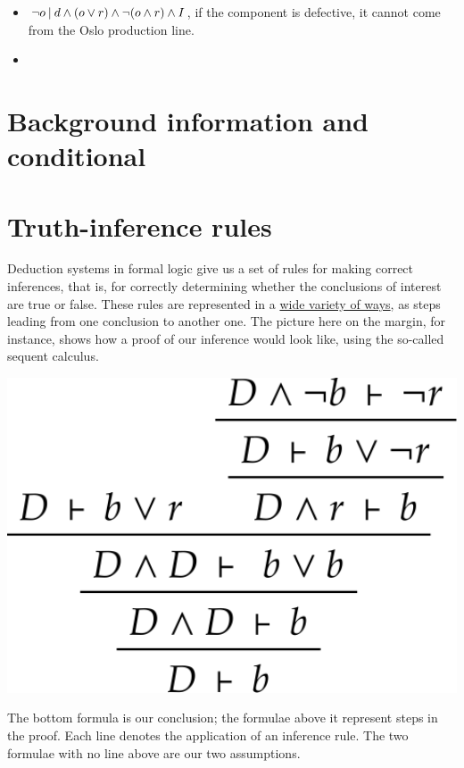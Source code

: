 \documentclass[
  a4paper,
  DIV=11,
  numbers=noendperiod,
  oneside]{scrreprt}
\begin{document}
\begin{itemize}
\item
  \(\lnot o \nonscript\:\vert\nonscript\:\mathopen{} d \land (o \lor r) \land \lnot (o \land r) \land I\),
  if the component is defective, it cannot come from the Oslo production
  line.
\item
\end{itemize}

\hypertarget{background-information-and-conditional}{%
\section{Background information and
conditional}\label{background-information-and-conditional}}

\hfill\break

\hypertarget{truth-inference-rules}{%
\section{Truth-inference rules}\label{truth-inference-rules}}

Deduction systems in formal logic give us a set of rules for making
correct inferences, that is, for correctly determining whether the
conclusions of interest are true or false. These rules are represented
in a
\href{https://plato.stanford.edu/archives/spr2023/entries/natural-deduction}{wide
variety of ways}, as steps leading from one conclusion to another one.
The picture here on the margin, for instance, shows how a proof of our
inference would look like, using the so-called sequent calculus.

\begin{marginfigure}

{\centering \includegraphics[width=1\textwidth,height=\textheight]{umbrella_inference_sequent.png}

}

\caption{The bottom formula is our conclusion; the formulae above it
represent steps in the proof. Each line denotes the application of an
inference rule. The two formulae with no line above are our two
assumptions.}

\end{marginfigure}
\end{document}
